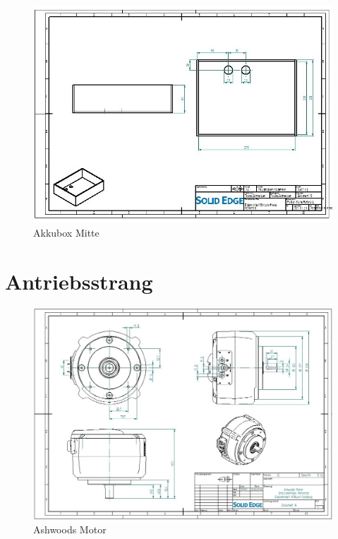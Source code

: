 \begin{figure} [H]
	\begin{center}
		\includegraphics[angle=90]{figures/mechanik/Box_3_Zeichnung.jpg}
		\caption{Akkubox Mitte}
		\label{fig:Akkubox Mitte}
	\end{center}
\end{figure}

\section{Antriebsstrang}
\begin{figure} [H]
	\begin{center}
		\includegraphics[angle=90, width=\textwidth]{figures/antrieb/Ashwoods_CAD.jpg}
		\caption{Ashwoods Motor}
		\label{Ashwoods_CAD}
	\end{center}
\end{figure}

